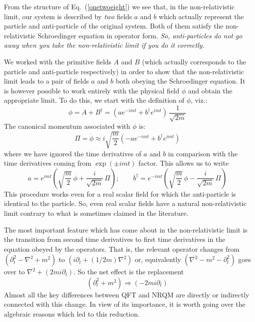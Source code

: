 \documentclass{article}
\def\eq#1{{Eq.~(\ref{#1})}}
\begin{document}
  From the structure of \eq{onetwoeight} we see that, in the non-relativistic limit, our system is described by \textit{two} fields $a$ and $b$ which actually represent the particle and anti-particle of the original system. Both of them satisfy the non-relativistic Schroedinger equation in operator form. \textit{So, anti-particles do not go away when you take the non-relativistic limit if you do it correctly. }
  
  We worked with the primitive fields $A$ and $B$ (which actually corresponds to the particle and anti-particle respectively) in order to show that the non-relativistic limit leads to a pair of fields $a$ and $b$ both obeying the Schroedinger equation. It is however possible to work entirely with the physical field $\phi$ and obtain the appropriate limit. To do this, we start with the definition of $\phi$, viz.: 
\begin{equation}
 \phi= A + B^\dagger = \left( a e^{-imt} + b^\dagger e^{imt}\right) \, \frac{1}{\sqrt{2m}}
\end{equation}
  The canonical momentum associated with $\phi$ is:
\begin{equation}
 \Pi = \dot \phi \approx i \sqrt{\frac{m}{2}} \left( -a e^{-imt} + b^\dagger e^{imt}\right) 
\end{equation} 
 where we have ignored the time derivatives of $a$ and $b$ in comparison with the time derivatives coming from $\exp(\pm imt)$ factor. This allows us to write 
\begin{equation}
 a =  e^{imt} \left(\sqrt{\frac{m}{2}}\, \phi  + \frac{i}{\sqrt{2m}} \, \Pi\right); \qquad
  b^\dagger =  e^{-imt} \left(\sqrt{\frac{m}{2}}\, \phi  - \frac{i}{\sqrt{2m}} \, \Pi\right)
\end{equation} 
This procedure works even for a real scalar field for which the anti-particle is identical to the particle. So, even real scalar fields have a natural non-relativistic limit contrary to what is sometimes claimed in the literature.


 The most important feature which has come about in the non-relativistic limit is the transition from second time derivatives to first time derivatives in the equation obeyed by the operators. That is, the relevant operator changes from $(\partial_t^2-\nabla^2+m^2)$ to
 $(i\partial_t+(1/2m)\nabla^2)$ or, equivalently
 $(\nabla^2 -m^2-\partial_t^2)$ goes over to $ \nabla^2+(2mi\partial_t)$. So the net effect is the replacement
 \begin{equation}
  (\partial_t^2 +m^2)\Longrightarrow (-2mi\partial_t)
  \label{opchange}
 \end{equation} 
 Almost all the key differences between QFT and NRQM are directly or indirectly connected with this change. In view of its importance, it is worth going over the algebraic reasons which led to this reduction. 
 
\end{document}
